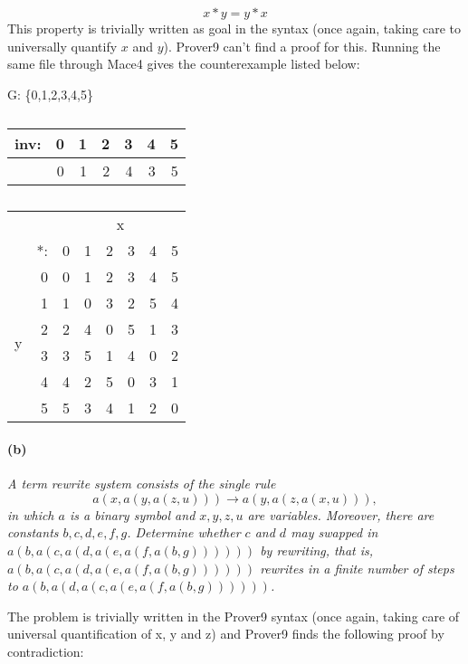 \documentclass[12pt]{article}
\begin{document}
\vspace{3mm}

\begin{equation*}
    x * y = y * x
\end{equation*}
This property is trivially written as goal in the syntax (once again, taking 
care to universally quantify $x$ and $y$). Prover9 can't find a proof for this. 
Running the same file through Mace4 gives the counterexample listed below:

\begin{table}[H]  \centering %
G: \{0,1,2,3,4,5\} \hspace{.5cm}
\begin{tabular}{r|rrrrrr}
inv: & 0 & 1 & 2 & 3 & 4 & 5\\
\hline
   & 0 & 1 & 2 & 4 & 3 & 5
\end{tabular} \hspace{.5cm}
\begin{tabular}{rr|rrrrrr}
& & \multicolumn{6}{c}{x} \\  
& *: & 0 & 1 & 2 & 3 & 4 & 5\\
\hline
\multirow{6}{*}{y} & 0 & 0 & 1 & 2 & 3 & 4 & 5 \\
     & 1 & 1 & 0 & 3 & 2 & 5 & 4 \\
     & 2 & 2 & 4 & 0 & 5 & 1 & 3 \\
     & 3 & 3 & 5 & 1 & 4 & 0 & 2 \\
     & 4 & 4 & 2 & 5 & 0 & 3 & 1 \\
     & 5 & 5 & 3 & 4 & 1 & 2 & 0
\end{tabular}
\caption{ }
\end{table} 

\paragraph{(b)} 
\textit{A term rewrite system consists of the single rule
$$a(x,a(y,a(z,u)))\rightarrow a(y,a(z,a(x,u))),$$
in which $a$ is a binary symbol and $x,y,z,u$ are variables.
Moreover, there are constants $b,c,d,e,f,g$. Determine whether
$c$ and $d$ may swapped in $a(b,a(c,a(d,a(e,a(f,a(b,g))))))$ by
rewriting, that is, $a(b,a(c,a(d,a(e,a(f,a(b,g))))))$ rewrites
in a finite number of steps to
$a(b,a(d,a(c,a(e,a(f,a(b,g))))))$.}

\vspace{3mm}

The problem is trivially written in the Prover9 syntax (once again, taking care
of universal quantification of x, y and z) and Prover9 finds the following 
proof by contradiction:
\end{document}
